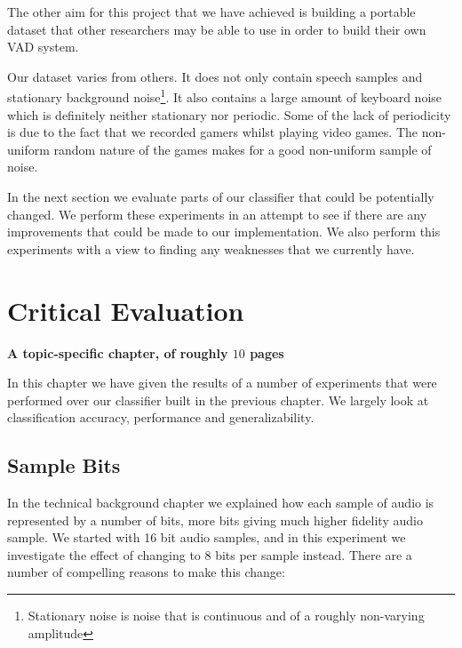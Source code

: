 \documentclass[ %
                    author={Sam Phippen},
                supervisor={Dr. Rafal Bogacz},
                     title={Real time voice activity detectors in noisy personal computing environments},
                  subtitle={},
                    degree={MEng},
                      year={2012} ]{thesis}
\begin{document}
The other aim for this project that we have achieved is building a portable
dataset that other researchers may be able to use in order to build their own
VAD system.

Our dataset varies from others. It does not only contain speech samples and
stationary background noise\footnote{Stationary noise is noise that is
continuous and of a roughly non-varying amplitude}. It also contains a large
amount of keyboard noise which is definitely neither stationary nor periodic.
Some of the lack of periodicity is due to the fact that we recorded gamers
whilst playing video games. The non-uniform random nature of the games makes
for a good non-uniform sample of noise.

In the next section we evaluate parts of our classifier that could be
potentially changed. We perform these experiments in an attempt to see if there
are any improvements that could be made to our implementation. We also perform
this experiments with a view to finding any weaknesses that we currently have.


\chapter{Critical Evaluation}
\label{chap:evaluation}

{\bf A topic-specific chapter, of roughly $10$ pages}
\vspace{1cm}

In this chapter we have given the results of a number of experiments that were
performed over our classifier built in the previous chapter. We largely look at
classification accuracy, performance and generalizability.

\section{Sample Bits}

In the technical background chapter we explained how each sample of audio is
represented by a number of bits, more bits giving much higher fidelity audio
sample. We started with 16 bit audio samples, and in this experiment we
investigate the effect of changing to 8 bits per sample instead. There are a
number of compelling reasons to make this change:
\end{document}

